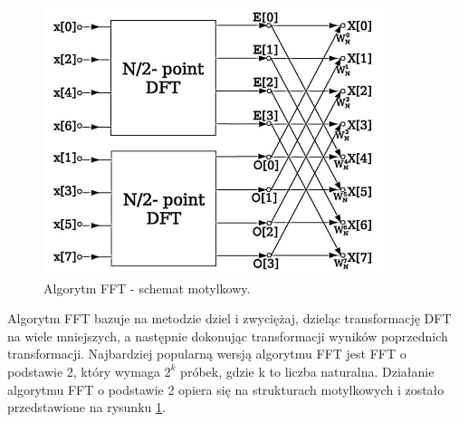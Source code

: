 \begin{figure}[H]
	\centering
	\includegraphics[width=10cm]{./grafiki/fft_motylki}
	\captionsetup{justification=centering}
	\caption{Algorytm FFT - schemat motylkowy.}
	\label{rys:fft_motyl}
\end{figure}

Algorytm FFT bazuje na metodzie dziel i zwyciężaj, dzieląc transformację DFT na wiele mniejszych, a następnie dokonując transformacji wyników poprzednich transformacji. Najbardziej popularną wersją algorytmu FFT jest FFT o podstawie 2, który wymaga $2^{k}$ próbek, gdzie k to liczba naturalna. Działanie algorytmu FFT o podstawie 2 opiera się na strukturach motylkowych i zostało przedstawione na rysunku \ref{rys:fft_motyl}. 